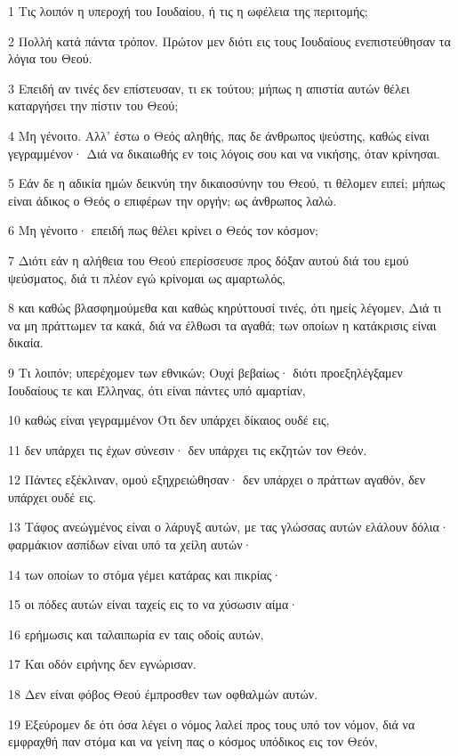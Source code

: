 \par 1 Τις λοιπόν η υπεροχή του Ιουδαίου, ή τις η ωφέλεια της περιτομής;
\par 2 Πολλή κατά πάντα τρόπον. Πρώτον μεν διότι εις τους Ιουδαίους ενεπιστεύθησαν τα λόγια του Θεού.
\par 3 Επειδή αν τινές δεν επίστευσαν, τι εκ τούτου; μήπως η απιστία αυτών θέλει καταργήσει την πίστιν του Θεού;
\par 4 Μη γένοιτο. Αλλ' έστω ο Θεός αληθής, πας δε άνθρωπος ψεύστης, καθώς είναι γεγραμμένον· Διά να δικαιωθής εν τοις λόγοις σου και να νικήσης, όταν κρίνησαι.
\par 5 Εάν δε η αδικία ημών δεικνύη την δικαιοσύνην του Θεού, τι θέλομεν ειπεί; μήπως είναι άδικος ο Θεός ο επιφέρων την οργήν; ως άνθρωπος λαλώ.
\par 6 Μη γένοιτο· επειδή πως θέλει κρίνει ο Θεός τον κόσμον;
\par 7 Διότι εάν η αλήθεια του Θεού επερίσσευσε προς δόξαν αυτού διά του εμού ψεύσματος, διά τι πλέον εγώ κρίνομαι ως αμαρτωλός,
\par 8 και καθώς βλασφημούμεθα και καθώς κηρύττουσί τινές, ότι ημείς λέγομεν, Διά τι να μη πράττωμεν τα κακά, διά να έλθωσι τα αγαθά; των οποίων η κατάκρισις είναι δικαία.
\par 9 Τι λοιπόν; υπερέχομεν των εθνικών; Ουχί βεβαίως· διότι προεξηλέγξαμεν Ιουδαίους τε και Έλληνας, ότι είναι πάντες υπό αμαρτίαν,
\par 10 καθώς είναι γεγραμμένον Ότι δεν υπάρχει δίκαιος ουδέ εις,
\par 11 δεν υπάρχει τις έχων σύνεσιν· δεν υπάρχει τις εκζητών τον Θεόν.
\par 12 Πάντες εξέκλιναν, ομού εξηχρειώθησαν· δεν υπάρχει ο πράττων αγαθόν, δεν υπάρχει ουδέ εις.
\par 13 Τάφος ανεώγμένος είναι ο λάρυγξ αυτών, με τας γλώσσας αυτών ελάλουν δόλια· φαρμάκιον ασπίδων είναι υπό τα χείλη αυτών·
\par 14 των οποίων το στόμα γέμει κατάρας και πικρίας·
\par 15 οι πόδες αυτών είναι ταχείς εις το να χύσωσιν αίμα·
\par 16 ερήμωσις και ταλαιπωρία εν ταις οδοίς αυτών,
\par 17 Και οδόν ειρήνης δεν εγνώρισαν.
\par 18 Δεν είναι φόβος Θεού έμπροσθεν των οφθαλμών αυτών.
\par 19 Εξεύρομεν δε ότι όσα λέγει ο νόμος λαλεί προς τους υπό τον νόμον, διά να εμφραχθή παν στόμα και να γείνη πας ο κόσμος υπόδικος εις τον Θεόν,

